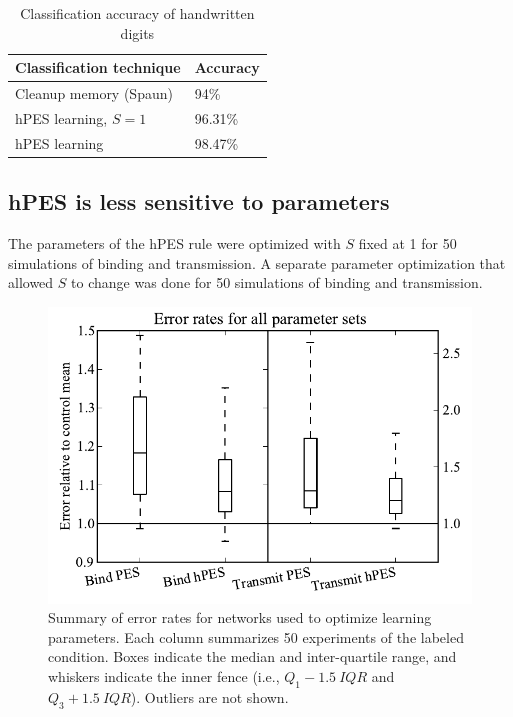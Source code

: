 \documentclass[10pt,letterpaper]{article}
\begin{document}
\begin{table}[!ht]
\begin{center} 
\caption{Classification accuracy of handwritten digits} 
\label{tab:digits} 
\vskip 0.12in
\begin{tabular}{ll} 
\hline
Classification technique & Accuracy \\
\hline
Cleanup memory (Spaun)   & 94\% \\
hPES learning, $S = 1$   & 96.31\% \\
hPES learning            & 98.47\% \\
\hline
\end{tabular} 
\end{center} 
\end{table}

\subsection{hPES is less sensitive to parameters}

The parameters of the hPES rule were optimized with
$S$ fixed at 1 for 50 simulations of binding and transmission.
A separate parameter optimization that allowed $S$ to change
was done for 50 simulations of binding and transmission.

\begin{figure}[ht]
\begin{center}
\includegraphics[width=\columnwidth]{fig5-param-boxplot}
\end{center}
\caption{Summary of error rates for networks used
  to optimize learning parameters. Each column
  summarizes 50 experiments of the labeled condition.
  Boxes indicate the median and inter-quartile range,
  and whiskers indicate the inner fence (i.e.,
  $Q_1 - 1.5 \: IQR$ and $Q_3 + 1.5 \: IQR$).
  Outliers are not shown.}
\label{fig:params}
\end{figure}
\end{document}
